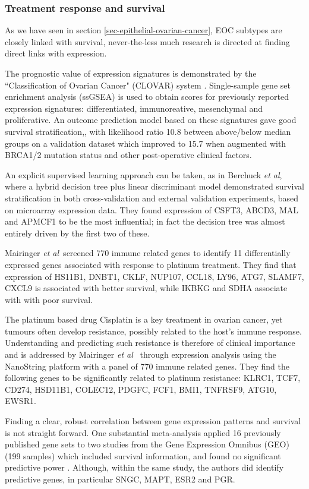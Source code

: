 \documentclass[tikz, 12pt,a4paper,oneside,fleqn]{article}
\newcommand{\etal}{{\em et al\/}}
\begin{document}
\subsubsection{Treatment response and survival}

As we have seen in section \ref{sec-epithelial-ovarian-cancer}, EOC subtypes are closely linked with survival, never-the-less much research is directed at finding direct links with expression.

The prognostic value of expression signatures is demonstrated by the ``Classification of Ovarian Cancer" (CLOVAR) system \cite{Verhaak2013}.  
Single-sample gene set enrichment analysis (ssGSEA) is used to obtain scores for previously reported expression signatures: differentiated, immunoreative, mesenchymal and proliferative.  
An outcome prediction model based on these signatures gave good survival stratification,, with likelihood ratio 10.8 between above/below median groups on a validation dataset which improved to 15.7 when augmented with BRCA1/2 mutation status and other post-operative clinical factors.

An explicit supervised learning approach can be taken, as in Berchuck \etal, where a hybrid decision tree plus linear discriminant model demonstrated survival stratification in both cross-validation and external validation experiments, based on microarray expression data.   
They found expression of CSFT3, ABCD3, MAL and APMCF1 to be the most influential; in fact the decision tree was almost entirely driven by the first two of these.

Mairinger \etal\ screened 770 immune related genes to identify 11 differentially expressed genes associated with response to platinum treatment.  
They find that expression of HS11B1, DNBT1, CKLF, NUP107, CCL18, LY96, ATG7, SLAMF7, CXCL9 is associated with better survival, while IKBKG and SDHA associate with with poor survival.

The platinum based drug Cisplatin is a key treatment in ovarian cancer, yet tumours often develop resistance, possibly related to the host's immune response.  
Understanding and predicting such resistance is therefore of clinical importance and is addressed by Mairinger \etal\ \cite{Mairinger2019} through expression analysis using the NanoString platform with a panel of 770 immune related genes.   
They find the following genes to be significantly related to platinum resistance: KLRC1, TCF7, CD274, HSD11B1, COLEC12, PDGFC, FCF1, BMI1, TNFRSF9, ATG10, EWSR1.

Finding a clear, robust correlation between gene expression patterns and survival is not straight forward.  
One substantial meta-analysis applied 16 previously published gene sets to two studies from the Gene Expression Omnibus (GEO) (199 samples) which included survival information, and found no significant predictive power \cite{Fekete2012}.  
Although, within the same study, the authors did identify predictive genes, in particular SNGC, MAPT, ESR2 and PGR.
\end{document}
